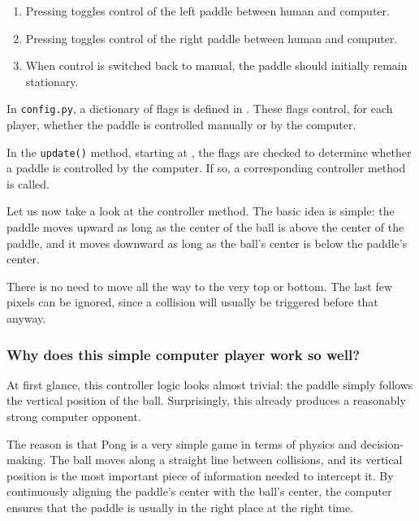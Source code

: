 \begin{enumerate}
	\item Pressing  toggles control of the left paddle between human and computer.\label{req0201Computer1}
	
	\item Pressing  toggles control of the right paddle between human and computer.\label{req0201Computer2}
	
	\item When control is switched back to manual, the paddle should initially remain stationary.\label{req0201ComputerHalt}
\end{enumerate}
\er

In \texttt{config.py}, a dictionary of flags is defined in . These flags control, for each player, whether the paddle is controlled manually or by the computer.


In the \texttt{update()} method, starting at , the flags are checked to determine whether a paddle is controlled by the computer.  
If so, a corresponding controller method is called.


Let us now take a look at the controller method. The basic idea is simple: the paddle moves upward as long as the center of the ball is above the center of the paddle, and it moves downward as long as the ball’s center is below the paddle’s center.  

There is no need to move all the way to the very top or bottom.  The last few pixels can be ignored, since a collision will usually be triggered before that anyway.

\subsubsection*{Why does this simple computer player work so well?}

At first glance, this controller logic looks almost trivial: the paddle simply follows the vertical position of the ball. Surprisingly, this already produces a reasonably strong computer opponent.

The reason is that Pong is a very simple game in terms of physics and decision-making. The ball moves along a straight line between collisions, and its vertical position is the most important piece of information needed to intercept it. By continuously aligning the paddle’s center with the ball’s center, the computer ensures that the paddle is usually in the right place at the right time.

